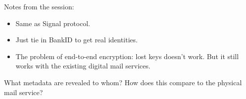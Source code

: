 Notes from the session:
\begin{itemize}
  \item Same as Signal protocol.
  \item Just tie in BankID to get real identities.
  \item The problem of end-to-end encryption: lost keys doesn't work. But it 
    still works with the existing digital mail services.
\end{itemize}

\begin{frame}
  \begin{exercise}
    What metadata are revealed to whom?
    How does this compare to the physical mail service?
  \end{exercise}
\end{frame}

